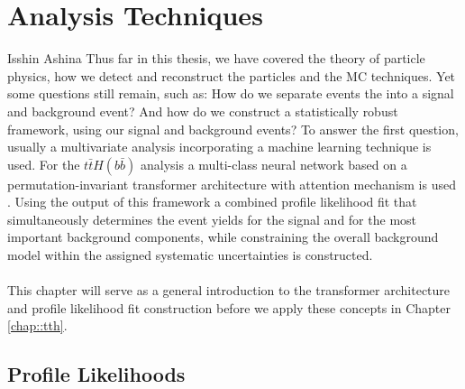 \chapter{Analysis Techniques}
\label{chap:AnalTech}
%
{Isshin Ashina}
Thus far in this thesis, we have covered the theory of particle physics, how we detect and reconstruct the particles and the MC techniques. Yet some questions still remain, such as: How do we separate events the into a signal and background event? And how do we construct a statistically robust framework, using our signal and background events? To answer the first question, usually a multivariate analysis incorporating a machine learning technique is used. For the $t\bar{t}H(b\bar{b})$ analysis a  multi-class neural network based on a permutation-invariant transformer architecture with attention mechanism is used \cite{attentionisallyouneed}. Using the output of this framework a combined profile likelihood fit that simultaneously determines the event yields for the signal and for the most important background components, while constraining the overall background model within the assigned systematic uncertainties is constructed.\\
\\
This chapter will serve as a general introduction to the transformer architecture and profile likelihood fit construction before we apply these concepts in Chapter \ref{chap::tth}.

\section{Profile Likelihoods}
